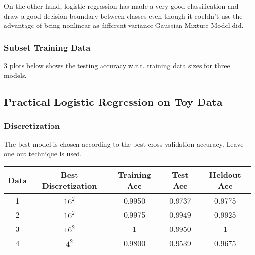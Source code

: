 \documentclass[letter,11pt]{article}
\begin{document}
		 On the other hand, logistic regression has made a very good classification and draw a good decision boundary between classes even though it couldn't use the advantage of being nonlinear as different variance Gaussian Mixture Model did.
		 
		 
		 
	 \subsubsection{Subset Training Data}
	 3 plots below shows the testing accuracy w.r.t. training data sizes for three models.


	\subsection{Practical Logistic Regression on Toy Data}
	\subsubsection{Discretization}
	The best model is chosen according to the best cross-validation accuracy. Leave one out technique is used.
		\begin{center}
			\begin{tabular}{|c| c |c |c | c |} 
				\hline
				Data & Best Discretization & Training Acc & Test Acc & Heldout Acc\\ [0.5ex] 
				\hline
				1 & $16^2$ & 0.9950 & 0.9737 & 0.9775 \\ 
				\hline
				2 & $16^2$ & 0.9975 & 0.9949 & 0.9925 \\
				\hline
				3 & $16^2$ & 1 & 0.9950 & 1 \\
				\hline
				4 & $4^2$ & 0.9800 & 0.9539 & 0.9675\\
				\hline
			\end{tabular}
		\end{center}	 
\end{document}
